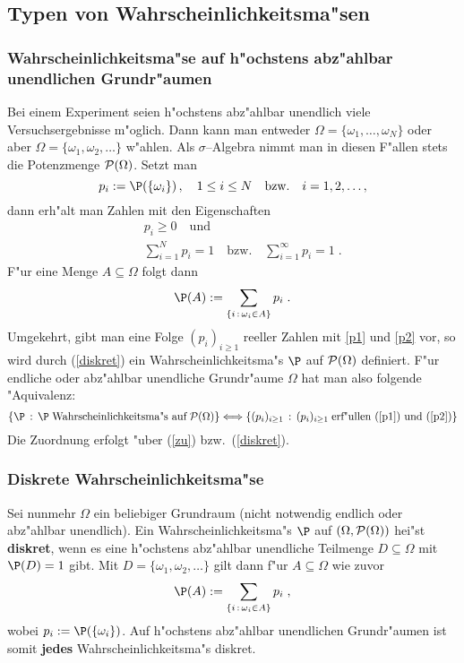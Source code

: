 \subsection{Typen von Wahrscheinlichkeitsma"sen}
\subsubsection{Wahrscheinlichkeitsma"se auf h"ochstens abz"ahlbar unendlichen Grundr"aumen}
Bei einem Experiment seien h"ochstens abz"ahlbar unendlich viele Versuchsergebnisse
m"oglich. Dann kann man entweder $\Omega=\{\omega_1,\ldots,\omega_N\}$ oder
aber $\Omega=\{\omega_1,\omega_2,\ldots\}$ w"ahlen. Als $\sigma$--Algebra nimmt man in diesen
F"allen stets die Potenzmenge $\mathcal P(\Omega)$. Setzt man
\begin{equation}
\label{zu}
p_i :=\P(\{\omega_i\})\,,\quad 1\le i\le N\quad\mbox{bzw.}\quad i=1,2,\ldots,
\end{equation}
dann erh"alt man Zahlen mit den Eigenschaften
\begin{eqnarray}
\label{p1}
&&p_i\ge 0\quad \mbox{und}\\
\label{p2}
&&\sum_{i=1}^N p_i =1\quad \mbox{bzw.}\quad \sum_{i=1}^\infty p_i =1\;.
\end{eqnarray}
F"ur eine Menge $A\subseteq \Omega$ folgt dann
\begin{equation}
\label{diskret}
\P(A):= \sum_{\{i\, : \,\omega_i\in A\}} p_i\;.
\end{equation}
Umgekehrt, gibt man eine Folge $(p_i)_{i\ge 1}$ reeller Zahlen mit \eqref{p1} und \eqref{p2} vor,
so wird durch (\ref{diskret}) ein Wahrscheinlichkeitsma"s $\P$ auf $\mathcal P(\Omega)$ definiert. F"ur
endliche oder abz"ahlbar unendliche Grundr"aume $\Omega$ hat man also folgende "Aquivalenz$\colon$
$$
\{\P\,:\,\P\;\mbox{Wahrscheinlichkeitsma"s auf}\;\fr P(\Omega)\}
\Longleftrightarrow\{(p_i)_{i\ge 1}\,:\, (p_i)_{i\ge 1}\;\mbox{erf"ullen (\ref{p1}) und (\ref{p2})}\}
$$
Die Zuordnung erfolgt "uber (\ref{zu}) bzw.~(\ref{diskret}).

\subsubsection{Diskrete Wahrscheinlichkeitsma"se}
Sei nunmehr $\Omega$ ein beliebiger Grundraum (nicht notwendig endlich
oder abz"ahlbar unendlich). Ein Wahrscheinlichkeitsma"s $\P$ auf $(\Omega,\mathcal P(\Omega))$
hei"st \textbf{diskret}, wenn es eine h"ochstens abz"ahlbar unendliche Teilmenge $D\subseteq \Omega$
mit $\P(D)=1$ gibt. Mit $D=\{\omega_1,\omega_2,\ldots\}$ gilt dann f"ur $A\subseteq \Omega$ wie zuvor
$$
\P(A):= \sum_{\{i\, : \,\omega_i\in A\}} p_i\;,
$$
wobei $p_i:=\P(\{\omega_i\})$. Auf h"ochstens abz"ahlbar unendlichen Grundr"aumen ist somit \textbf{jedes}
Wahrscheinlichkeitsma"s diskret.
